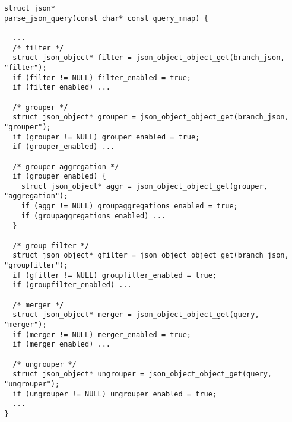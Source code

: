 \begin{lstlisting}
struct json*
parse_json_query(const char* const query_mmap) {

  ...
  /* filter */
  struct json_object* filter = json_object_object_get(branch_json, "filter");
  if (filter != NULL) filter_enabled = true;
  if (filter_enabled) ...

  /* grouper */
  struct json_object* grouper = json_object_object_get(branch_json, "grouper");
  if (grouper != NULL) grouper_enabled = true;
  if (grouper_enabled) ...

  /* grouper aggregation */
  if (grouper_enabled) {
    struct json_object* aggr = json_object_object_get(grouper, "aggregation");
    if (aggr != NULL) groupaggregations_enabled = true;
    if (groupaggregations_enabled) ...
  }

  /* group filter */
  struct json_object* gfilter = json_object_object_get(branch_json, "groupfilter");
  if (gfilter != NULL) groupfilter_enabled = true;
  if (groupfilter_enabled) ...

  /* merger */
  struct json_object* merger = json_object_object_get(query, "merger");
  if (merger != NULL) merger_enabled = true;
  if (merger_enabled) ...

  /* ungrouper */
  struct json_object* ungrouper = json_object_object_get(query, "ungrouper");
  if (ungrouper != NULL) ungrouper_enabled = true;
  ...
}
\end{lstlisting}

